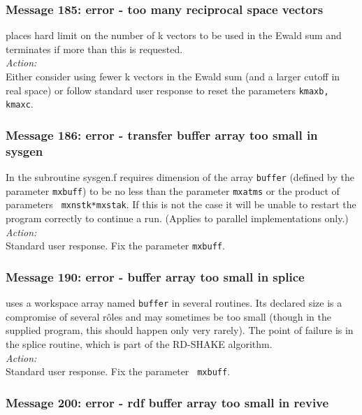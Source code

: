 \subsubsection*{Message 185: error - too many reciprocal space vectors}

\D{} places hard limit on the number of k vectors to be used in the
Ewald sum  and terminates if more than this is requested. \\

\noindent
{\em Action:} \\ Either consider using fewer k vectors in the Ewald
sum (and a larger cutoff in real space) or follow standard user
response to reset the parameters {\tt kmaxb, kmaxc}.

\subsubsection*{Message 186: error - transfer buffer array too small in sysgen}

In the subroutine {\sc sysgen.f} \D{} requires dimension of the array
{\tt buffer} (defined by the parameter {\tt mxbuff}) to be no less
than the parameter {\tt mxatms} or the product of parameters {\tt
mxnstk*mxstak}. If this is not the case it will be unable to restart
the program correctly to continue a run. (Applies to parallel
implementations only.)\\

\noindent
{\em Action:} \\ Standard user response. Fix the parameter {\tt mxbuff}.

\subsubsection*{Message 190: error - buffer array too small in splice}

\D{} uses a workspace array named {\tt buffer} in several
routines. Its declared size is a compromise of several r\^{o}les and
may sometimes be too small (though in the supplied program, this
should happen only very rarely). The point of failure is in the
{\sc splice} routine, which is part of the RD-SHAKE
algorithm. \\

\noindent
{\em Action:} \\ Standard user response. Fix the parameter {\tt
mxbuff}.

\subsubsection*{Message 200: error - rdf buffer array too small in
revive}

